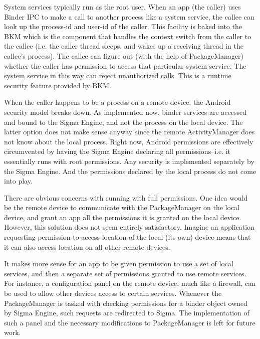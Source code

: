 \documentclass[prodmode]{acmlarge}
\begin{document}
System services typically run as the root user. When an app (the caller) uses Binder IPC to make a call to another process like a system service, the callee can look up the process-id and user-id of the caller. This facility is baked into the BKM which is the component that handles the context switch from the caller to the callee (i.e. the caller thread sleeps, and wakes up a receiving thread in the callee's process). The callee can figure out (with the help of PackageManager) whether the caller has permission to access that particular system service. The system service in this way can reject unauthorized calls. This is a runtime security feature provided by BKM.

When the caller happens to be a process on a remote device, the Android security model breaks down. As implemented now, binder services are accessed and bound to the Sigma Engine, and not the process on the local device. The latter option does not make sense anyway since the remote ActivityManager does not know about the local process. Right now, Android permissions are effectively circumvented by having the Sigma Engine declaring all permissions--i.e. it essentially runs with root permissions. Any security is implemented separately by the Sigma Engine. And the permissions declared by the local process do not come into play.

There are obvious concerns with running with full permissions. One idea would be the remote device to communicate with the PackageManager on the local device, and grant an app all the permissions it is granted on the local device. However, this solution does not seem entirely satisfactory. Imagine an application requesting permission to access location of the local (its own) device means that it can also access location on all other remote devices.

It makes more sense for an app to be given permission to use a set of local services, and then a separate set of permissions granted to use remote services. For instance, a configuration panel on the remote device, much like a firewall, can be used to allow other devices access to certain services. Whenever the PackageManager is tasked with checking permissions for a binder object owned by Sigma Engine, such requests are redirected to Sigma. The implementation of such a panel and the necessary modifications to PackageManager is left for future work.
\end{document}

